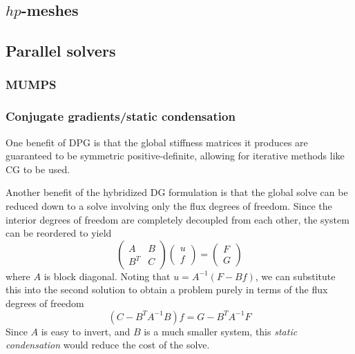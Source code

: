 \documentclass{article}
\begin{document}
\subsection{$hp$-meshes}
\subsection{Parallel solvers}
\subsubsection{MUMPS}
\subsubsection{Conjugate gradients/static condensation}

One benefit of DPG is that the global stiffness matrices it produces are guaranteed to be symmetric positive-definite, allowing for iterative methods like CG to be used. 

Another benefit of the hybridized DG formulation is that the global solve can be reduced down to a solve involving only the flux degrees of freedom. Since the interior degrees of freedom are completely decoupled from each other, the system can be reordered to yield 
\[
\left(\begin{array}{cc}
A &B\\
B^T &C
\end{array}
\right)
\left(\begin{array}{c}
u\\
f
\end{array}
\right) = 
\left(\begin{array}{c}
F\\
G
\end{array}
\right)
\]
where $A$ is block diagonal. Noting that $u = A^{-1}(F-Bf)$, we can substitute this into the second solution to obtain a problem purely in terms of the flux degrees of freedom
\[
(C-B^TA^{-1}B)f = G-B^TA^{-1}F
\]
Since $A$ is easy to invert, and $B$ is a much smaller system, this \emph{static condensation} would reduce the cost of the solve.



\end{document}
